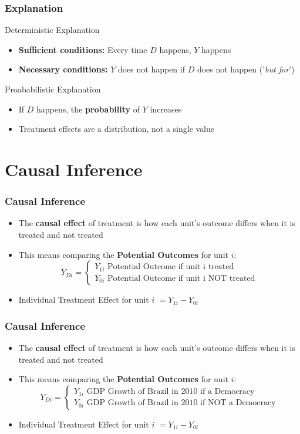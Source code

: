 \documentclass[xcolor=x11names,compress]{beamer}\usepackage[]{graphicx}\usepackage[]{color}
\renewcommand{\(}{\begin{columns}}
\renewcommand{\)}{\end{columns}}
\newcommand{\<}[1]{\begin{column}{#1}}
\renewcommand{\>}{\end{column}}
\begin{document}
\begin{frame}
\frametitle{Explanation}
\begin{multicols}{2}
Deterministic Explanation
\pause
\begin{itemize}
\item \textbf{Sufficient conditions:} Every time $D$ happens, $Y$ happens
\pause
\item \textbf{Necessary conditions:} $Y$ does not happen if $D$ does not happen ('\textit{but for}')
\end{itemize}
\pause
\columnbreak
Proababilistic Explanation
\pause
\begin{itemize}
\item If $D$ happens, the \textbf{probability} of $Y$ increases
\pause
\item Treatment effects are a distribution, not a single value
\end{itemize}
\end{multicols}
\end{frame}

\section{Causal Inference}

\begin{frame}
\frametitle{Causal Inference}
\begin{itemize}
\item The \textbf{causal effect} of treatment is how each unit's outcome differs when it is treated and not treated
\pause
\item This means comparing the \textbf{Potential Outcomes} for unit $i$:
\[
Y_{Di} = 
\begin{cases}
Y_{1i}\text{   Potential Outcome if unit i treated} \\
Y_{0i}\text{   Potential Outcome if unit i NOT treated}
\end{cases}
\]
\item Individual Treatment Effect for unit $i$ $ = Y_{1i} - Y_{0i}$
\end{itemize}
\end{frame}

\begin{frame}
\frametitle{Causal Inference}
\begin{itemize}
\item The \textbf{causal effect} of treatment is how each unit's outcome differs when it is treated and not treated
\item This means comparing the \textbf{Potential Outcomes} for unit $i$:
\[
Y_{Di} = 
\begin{cases}
Y_{1i}\text{   GDP Growth of Brazil in 2010 if a Democracy} \\
Y_{0i}\text{   GDP Growth of Brazil in 2010 if NOT a Democracy}
\end{cases}
\]
\item Individual Treatment Effect for unit $i$ $ = Y_{1i} - Y_{0i}$
\end{itemize}
\end{frame}
\end{document}
